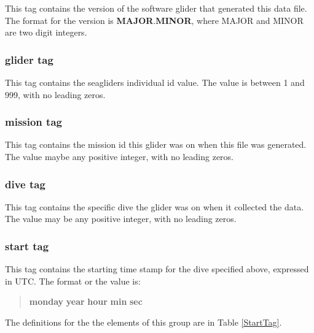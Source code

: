 \documentclass[12pt,english,twoside]{book}
\begin{document}
This tag contains the version of the software glider that generated
this data file. The format for the version is \textbf{MAJOR}.\textbf{MINOR},
where MAJOR and MINOR are two digit integers.


\subsubsection{glider tag}

This tag contains the seagliders individual id value. The value is
between 1 and 999, with no leading zeros.


\subsubsection{mission tag}

This tag contains the mission id this glider was on when this file
was generated. The value maybe any positive integer, with no leading
zeros.


\subsubsection{dive tag}

This tag contains the specific dive the glider was on when it collected
the data. The value may be any positive integer, with no leading zeros.


\subsubsection{start tag}

This tag contains the starting time stamp for the dive specified above,
expressed in UTC. The format or the value is:

\begin{quote}
\textbf{mon}\space\textbf{day} \textbf{year} \textbf{hour} \textbf{min}
\textbf{sec} 
\end{quote}
The definitions for the the elements of this group are in Table \ref{StartTag}.
\end{document}
